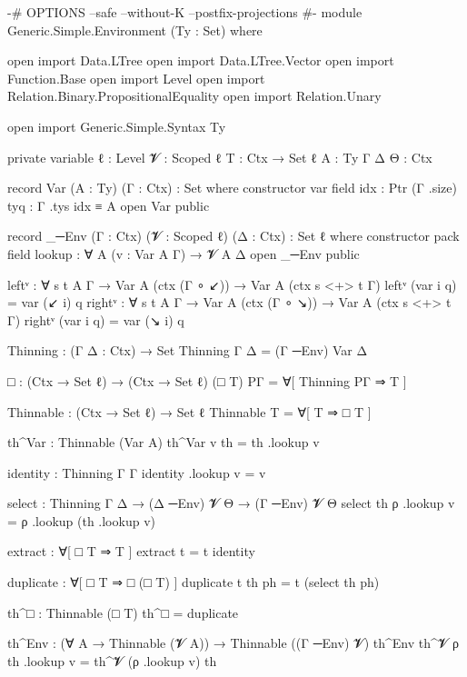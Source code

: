 \begin{code}
{-# OPTIONS --safe --without-K --postfix-projections #-}
module Generic.Simple.Environment (Ty : Set) where

  open import Data.LTree
  open import Data.LTree.Vector
  open import Function.Base
  open import Level
  open import Relation.Binary.PropositionalEquality
  open import Relation.Unary

  open import Generic.Simple.Syntax Ty

  private
    variable
      ℓ : Level
      𝓥 : Scoped ℓ
      T : Ctx → Set ℓ
      A : Ty
      Γ Δ Θ : Ctx

  record Var (A : Ty) (Γ : Ctx) : Set where
    constructor var
    field
      idx : Ptr (Γ .size)
      tyq : Γ .tys idx ≡ A
  open Var public

  record _─Env (Γ : Ctx) (𝓥 : Scoped ℓ) (Δ : Ctx) : Set ℓ where
    constructor pack
    field lookup : ∀ {A} (v : Var A Γ) → 𝓥 A Δ
  open _─Env public

  leftᵛ : ∀ {s t A Γ} → Var A (ctx (Γ ∘ ↙)) → Var A (ctx {s <+> t} Γ)
  leftᵛ (var i q) = var (↙ i) q
  rightᵛ : ∀ {s t A Γ} → Var A (ctx (Γ ∘ ↘)) → Var A (ctx {s <+> t} Γ)
  rightᵛ (var i q) = var (↘ i) q

  Thinning : (Γ Δ : Ctx) → Set
  Thinning Γ Δ = (Γ ─Env) Var Δ

  □ : (Ctx → Set ℓ) → (Ctx → Set ℓ)
  (□ T) PΓ = ∀[ Thinning PΓ ⇒ T ]

  Thinnable : (Ctx → Set ℓ) → Set ℓ
  Thinnable T = ∀[ T ⇒ □ T ]

  th^Var : Thinnable (Var A)
  th^Var v th = th .lookup v

  identity : Thinning Γ Γ
  identity .lookup v = v

  select : Thinning Γ Δ → (Δ ─Env) 𝓥 Θ → (Γ ─Env) 𝓥 Θ
  select th ρ .lookup v = ρ .lookup (th .lookup v)

  extract : ∀[ □ T ⇒ T ]
  extract t = t identity

  duplicate : ∀[ □ T ⇒ □ (□ T) ]
  duplicate t th ph = t (select th ph)

  th^□ : Thinnable (□ T)
  th^□ = duplicate

  th^Env : (∀ {A} → Thinnable (𝓥 A)) → Thinnable ((Γ ─Env) 𝓥)
  th^Env th^𝓥 ρ th .lookup v = th^𝓥 (ρ .lookup v) th
\end{code}
